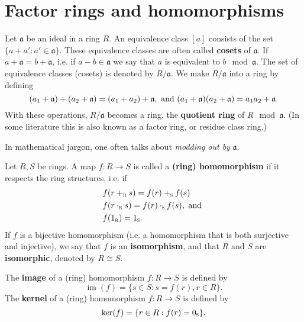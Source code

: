 \documentclass[english,bachelor]{liumaiex}
\DeclareMathOperator{\im}{im}
\begin{document}
\section{Factor rings and homomorphisms}
\begin{define}
Let $\mathfrak{a}$ be an ideal in a ring $R$. An equivalence class $[a]$ consists of the set $\{a+a' : a'\in \mathfrak{a}\}.$ These equivalence classes are often called \textbf{cosets} of $\mathfrak{a}$. If $a+\mathfrak{a}=b+\mathfrak{a}$, i.e. if $a-b \in \mathfrak{a}$ we say that $a$ is equivalent to $b \mod{\mathfrak{a}}$. The set of equivalence classes (cosets) is denoted by $R/\mathfrak{a}.$ We make $R/\mathfrak{a}$ into a ring by defining
\begin{displaymath}
(a_1+\mathfrak{a})+(a_2+\mathfrak{a})=(a_1+a_2)+\mathfrak{a}, \textrm{ and }\\
(a_1+\mathfrak{a})(a_2+\mathfrak{a})=a_1a_2+\mathfrak{a}.
\end{displaymath}
With these operations, $R/\mathfrak{a}$ becomes a ring, the \textbf{quotient ring} of $R \mod{\mathfrak{a}}$. (In some literature this is also known as a factor ring, or residue class ring.)
\end{define}

\begin{rem}
In mathematical jargon, one often talks about \emph{modding out by} $\mathfrak{a}$.
\end{rem}

\begin{define}
Let $R,S$ be rings. A map $f\colon R\to S$ is called a \textbf{(ring) homomorphism} if it respects the ring structures, i.e. if 
\begin{align*}
& f(r+_\textsc{r}s)=f(r)+_\textsc{s}f(s)\\ & f(r\cdot_\textsc{r}s)=f(r)\cdot_\textsc{s}f(s), \textrm{ and } \\ & f(1_\textsc{r}) = 1_\textsc{s}.
\end{align*}
If $f$ is a bijective homomorphism (i.e. a homomorphism that is both surjective and injective), we say that $f$ is an \textbf{isomorphism}, and that $R$ and $S$ are \textbf{isomorphic}, denoted by $R \cong S$.
\end{define}

\begin{define}
The \textbf{image} of a (ring) homomorphism $f\colon R\to S$ is defined by
$$\im(f) = \{s\in S : s=f(r), r\in R\}.$$
The \textbf{kernel} of a (ring) homomorphism $f\colon R\to S$ is defined by 
$$\ker(f) = \{r\in R : f(r)=0_\textsc{s}\}.$$
\end{define}
\end{document}
